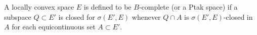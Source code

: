 A locally convex space $E$ is defined to be $B$-complete (or a Ptak space) if a subspace $Q \subset E'$ is closed for $\sigma(E', E)$ whenever $Q \cap A$ is $\sigma(E', E)$-closed in $A$ for each equicontinuous set $A \subset E'$.
